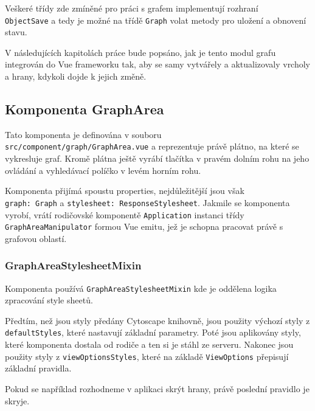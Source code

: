 \bigskip

Veškeré třídy zde zmíněné pro práci s grafem implementují rozhraní \\\texttt{ObjectSave} a tedy je možné na třídě \texttt{Graph} volat metody pro uložení a obnovení stavu.







\newpage

V následujících kapitolách práce bude popsáno, jak je tento modul grafu integrován do Vue frameworku tak, aby se samy vytvářely a aktualizovaly vrcholy a hrany, kdykoli dojde k jejich změně.

\subsection{Komponenta GraphArea} \label{komponenta-graph-area}
Tato komponenta je definována v souboru \\\texttt{src/component/graph/GraphArea.vue} a reprezentuje právě plátno, na které se vykresluje graf. Kromě plátna ještě vyrábí tlačítka v pravém dolním rohu na jeho ovládání a vyhledávací políčko v levém horním rohu.

Komponenta přijímá spoustu properties, nejdůležitější jsou však \\\texttt{graph: Graph} a \texttt{stylesheet: ResponseStylesheet}. Jakmile se komponenta vyrobí, vrátí rodičovské komponentě \texttt{Application} instanci třídy \\\texttt{GraphAreaManipulator} formou Vue emitu, jež je schopna pracovat právě s grafovou oblastí.

\subsubsection{GraphAreaStylesheetMixin}

Komponenta používá \texttt{GraphAreaStylesheetMixin} kde je oddělena logika \\zpracování style sheetů.

Předtím, než jsou styly předány Cytoscape knihovně, jsou použity výchozí styly z \texttt{defaultStyles}, které nastavují základní parametry. Poté jsou aplikovány styly, které komponenta dostala od rodiče a ten si je stáhl ze serveru. Nakonec jsou použity styly z \texttt{viewOptionsStyles}, které na základě \texttt{ViewOptions} přepisují základní pravidla.

Pokud se například rozhodneme v aplikaci skrýt hrany, právě poslední pravidlo je skryje.

